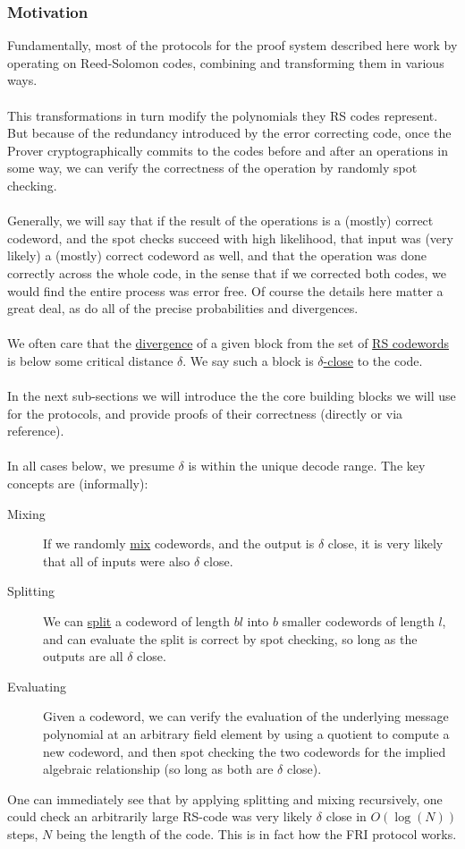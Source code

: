 \documentclass[10pt,letterpaper,titlepage]{article}
\newcommand{\dd}[0]{\delta}
\theoremstyle{definition}
\begin{document}
\begin{appendices}
\subsubsection{Motivation}
Fundamentally, most of the protocols for the proof system described here work by operating on Reed-Solomon codes, combining and transforming them in various ways.\\
\\
This transformations in turn modify the polynomials they RS codes represent.
But because of the redundancy introduced by the error correcting code, once the Prover cryptographically commits to the codes before and after an operations in some way, we can verify the correctness of the operation by randomly spot checking.\\
\\
Generally, we will say that if the result of the operations is a (mostly) correct codeword, and the spot checks succeed with high likelihood, that input was (very likely) a (mostly) correct codeword as well, and that the operation was done correctly across the whole code, in the sense that if we corrected both codes, we would find the entire process was error free.
Of course the details here matter a great deal, as do all of the precise probabilities and divergences.\\
\\
We often care that the \hyperref[divergence]{divergence} of a given block from the set of \hyperref[codeword]{RS codewords} is below some critical distance $\dd$. 
We say such a block is \hyperref[delta-close]{$\dd$-close} to the code.\\
\\
In the next sub-sections we will introduce the the core building blocks we will use for the protocols, and provide proofs of their correctness (directly or via reference).\\
\\
In all cases below, we presume $\dd$ is within the unique decode range.
The key concepts are (informally):
\begin{description}
  \item[Mixing] If we randomly \hyperref[mix]{mix} codewords, and the output is $\dd$ close, it is very likely that all of inputs were also $\dd$ close.
  \item[Splitting] We can \hyperref[split]{split} a codeword of length $bl$ into $b$ smaller codewords of length $l$, and can evaluate the split is correct by spot checking, so long as the outputs are all $\dd$ close. 
  \item[Evaluating] Given a codeword, we can verify the evaluation of the underlying message polynomial at an arbitrary field element by using a quotient to compute a new codeword, and then spot checking the two codewords for the implied algebraic relationship (so long as both are $\dd$ close).
\end{description}
\noindent
One can immediately see that by applying splitting and mixing recursively, one could check an arbitrarily large RS-code was very likely $\dd$ close in $O(\log(N))$ steps, $N$ being the length of the code.
This is in fact how the FRI protocol works.

\end{appendices}
\end{document}
